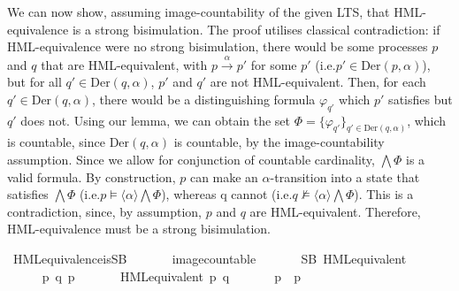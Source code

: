 \begin{isabellebody}
{\isafoldvisible}%
%
\isadelimvisible
%
\endisadelimvisible
%
\begin{isamarkuptext}%
We can now show, assuming image-countability of the given LTS, that HML-equivalence is a strong bisimulation. The proof utilises classical contradiction: 
if HML-equivalence were no strong bisimulation, there would be some processes $p$ and $q$ that are HML-equivalent, with $p \xrightarrow{\alpha} p'$ for some $p'$ (i.e.\@ $p' \in \text{Der}(p, \alpha)$), but for all $q' \in \text{Der}(q, \alpha)$, $p'$ and $q'$ are not HML-equivalent. 
Then, for each $q' \in \text{Der}(q, \alpha)$, there would be a distinguishing formula $\varphi_{q'}$ which $p'$ satisfies but $q'$ does not. 
Using our  lemma, we can obtain the set 
$\Phi = \{ \varphi_{q'} \}_{q' \in \text{Der}(q, \alpha)}$, which is countable, since $\text{Der}(q, \alpha)$ is countable, by the image-countability assumption.
Since we allow for conjunction of countable cardinality, $\bigwedge \Phi$ is a valid formula. 
By construction, $p$ can make an $\alpha$-transition into a state that satisfies $\bigwedge \Phi$ 
(i.e.\@ $p \vDash \langle\alpha\rangle \bigwedge \Phi$), whereas q cannot 
(i.e.\@ $q \not\vDash \langle\alpha\rangle \bigwedge \Phi$).
This is a contradiction, since, by assumption, $p$ and $q$ are HML-equivalent. 
Therefore, HML-equivalence must be a strong bisimulation.
\pagebreak%
\end{isamarkuptext}\isamarkuptrue%
%
\isadelimvisible
%
\endisadelimvisible
%
\isatagvisible
{}\isamarkupfalse%
\ HML{\isacharunderscore}{\kern0pt}equivalence{\isacharunderscore}{\kern0pt}is{\isacharunderscore}{\kern0pt}SB{\isacharcolon}{\kern0pt}\isanewline
\ \ \isanewline
\ \ \ \ {\isacartoucheopen}image{\isacharunderscore}{\kern0pt}countable{\isacartoucheclose}\isanewline
\ \ \isanewline
\ \ \ \ {\isacartoucheopen}SB\ HML{\isacharunderscore}{\kern0pt}equivalent{\isacartoucheclose}\isanewline
{}\isamarkupfalse%
\ {\isacharminus}{\kern0pt}\isanewline
\ \ \isacommand{{\isacharbraceleft}{\kern0pt}}\isamarkupfalse%
\isanewline
\ \ \ \ \isamarkupfalse%
\ p\ q\ p{\isacharprime}{\kern0pt}\ {\isasymalpha}\isanewline
\ \ \ \ \isamarkupfalse%
\ {\isacartoucheopen}HML{\isacharunderscore}{\kern0pt}equivalent\ p\ q{\isacartoucheclose}\ \isanewline
\ \ \ \ \isamarkupfalse%
\ {\isacartoucheopen}p\ {\isasymlongmapsto}{\isasymalpha}\ p{\isacharprime}{\kern0pt}{\isacartoucheclose}\isanewline
\ \ \ \ \isamarkupfalse%

\end{isabellebody}
